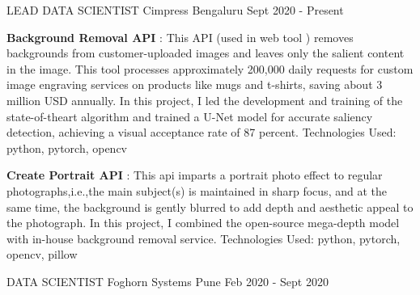 
\begin{cventries}

    \cventry
    {LEAD DATA SCIENTIST} %
    {Cimpress} %
    {Bengaluru} %
    {Sept 2020 - Present} %
    {
      \begin{cvitems} %
      \item{\textbf{Background Removal API} : This API (used in web tool 
      ) removes backgrounds from 
      customer-uploaded images and leaves only the salient 
      content in the image. This tool processes approximately 200,000 
      daily requests for custom image engraving services on products 
      like mugs and t-shirts, saving about 3 million USD annually. In this 
      project, I led the development and training of the state-of-theart 
       algorithm and trained a U-Net model for accurate saliency 
      detection, achieving a visual acceptance rate of 87 percent. 
      Technologies Used: python, pytorch, opencv }
      \item{\textbf{Create Portrait API} : This api imparts a portrait photo effect to
      regular photographs,i.e.,the main subject(s) is maintained in sharp focus, 
      and at the same time, the background is gently blurred to add depth and 
      aesthetic appeal to the photograph. In this project, I combined the 
      open-source mega-depth model with in-house background removal service. 
      Technologies Used: python, pytorch, opencv, pillow }
	\end{cvitems}
    }
\vspace{2em} %
  \cventry
    {DATA SCIENTIST} %
    {Foghorn Systems} %
    {Pune} %
    {Feb 2020 - Sept 2020} %
    {
      \begin{cvitems} %

\end{cvitems}}
\end{cventries}
